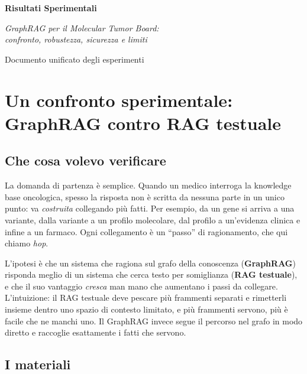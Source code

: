\documentclass[11pt,a4paper]{report}
\begin{document}
\begin{titlepage}
\centering
\vspace*{4cm}
{\Huge\bfseries Risultati Sperimentali\par}
\vspace{1.5cm}
{\Large\itshape GraphRAG per il Molecular Tumor Board:\\ confronto, robustezza, sicurezza e limiti\par}
\vspace{3cm}
{\large Documento unificato degli esperimenti\par}
\vfill
\end{titlepage}

\tableofcontents
\clearpage


\chapter{Un confronto sperimentale: GraphRAG contro RAG testuale}
\label{ch:graphrag-vs-rag}

\section{Che cosa volevo verificare}

La domanda di partenza è semplice. Quando un medico interroga la knowledge
base oncologica, spesso la risposta non è scritta da nessuna parte in un
unico punto: va \emph{costruita} collegando più fatti. Per esempio, da un
gene si arriva a una variante, dalla variante a un profilo molecolare, dal
profilo a un'evidenza clinica e infine a un farmaco. Ogni collegamento è un
``passo'' di ragionamento, che qui chiamo \emph{hop}.

L'ipotesi è che un sistema che ragiona sul grafo della conoscenza
(\textbf{GraphRAG}) risponda meglio di un sistema che cerca testo per
somiglianza (\textbf{RAG testuale}), e che il suo vantaggio \emph{cresca}
man mano che aumentano i passi da collegare. L'intuizione: il RAG testuale
deve pescare più frammenti separati e rimetterli insieme dentro uno spazio
di contesto limitato, e più frammenti servono, più è facile che ne manchi
uno. Il GraphRAG invece segue il percorso nel grafo in modo diretto e
raccoglie esattamente i fatti che servono.

\section{I materiali}
\end{document}
